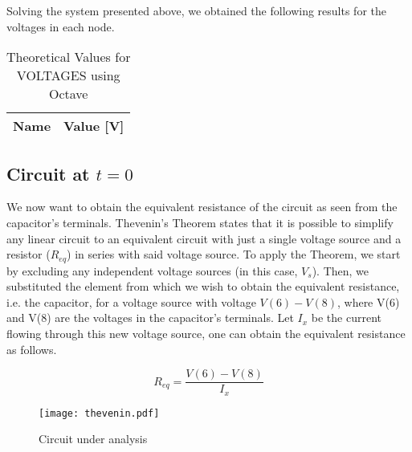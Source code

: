 Solving the system presented above, we obtained the following results for the voltages in each node.

\begin{table}[H]
  \centering
  \begin{tabular}{|l|r|}
    \hline
    {\bf Name} & {\bf Value [V]} \\ \hline
    
  \end{tabular}
  \caption{Theoretical Values for VOLTAGES using Octave}
  \label{tab:alinea1_voltagens_tab}
\end{table}

\subsection{Circuit at $t=0$}

We now want to obtain the equivalent resistance of the circuit as seen from the capacitor's terminals.
Thevenin’s Theorem states that it is possible to simplify any linear circuit to an equivalent circuit with just a single voltage source and a resistor ($R_{eq}$) in series with said voltage source.
To apply the Theorem, we start by excluding any independent voltage sources (in this case, $V_s$). Then, we substituted the element from which we wish to obtain the equivalent resistance, i.e. the capacitor, for a voltage source with voltage $V(6)-V(8)$, where V(6) and V(8) are the voltages in the capacitor's terminals. Let $I_x$ be the current flowing through this new voltage source, one can obtain the equivalent resistance as follows.

 \begin{center}
\begin{equation}
R_{eq}=\frac{V(6)-V(8)}{I_x}
\label{current law}
\end{equation}
\end{center}


\begin{figure}[H]
  \centering
  \texttt{[image: thevenin.pdf]}
  \caption{Circuit under analysis}
  \label{fig:thvenin}
\end{figure}

